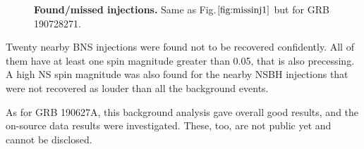 \documentclass[binding=0.6cm, LaM]{sapthesis}
\begin{document}
        \begin{figure}[!t]
          \noindent
          \label{missinj2_3}
          \centering
          \caption{\textbf{Found/missed injections.} Same as Fig.$\ref{fig:missinj1}$ but for GRB 190728271.}
          \label{fig:missinj2_3}
        \end{figure}
	Twenty nearby BNS injections were found not to be recovered confidently.
	All of them have at least one spin magnitude greater than 0.05, that is also precessing.  A high NS spin magnitude was also found for the nearby NSBH injections that were not recovered as louder than all the background events.

        As for GRB 190627A, this background analysis gave overall good results,
	and the on-source data results were investigated.
	These, too, are not public yet and cannot be disclosed.
\end{document}

